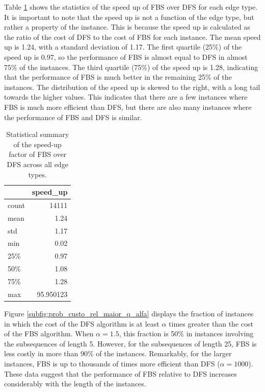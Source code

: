 \documentclass[journal=jacsat,manuscript=article]{achemso}
\begin{document}
Table \ref{tab:speedup_statistics} shows the statistics of the speed up of FBS over DFS for each edge type. It is important to note that the speed up is not a function of the edge type, but rather a property of the instance. This is because the speed up is calculated as the ratio of the cost of DFS to the cost of FBS for each instance. The mean speed up is 1.24, with a standard deviation of 1.17. The first quartile (25\%) of the speed up is 0.97, so the performance of FBS is almost equal to DFS in almost 75\% of the instances. The third quartile (75\%) of the speed up is 1.28, indicating that the performance of FBS is much better in the remaining 25\% of the instances. The distribution of the speed up is skewed to the right, with a long tail towards the higher values. This indicates that there are a few instances where FBS is much more efficient than DFS, but there are also many instances where the performance of FBS and DFS is similar.

\begin{table}[H]
    \centering
    \caption{\normalsize Statistical summary of the speed-up factor of FBS over DFS across all edge types.}
    \label{tab:speedup_statistics}
    \begin{tabular}{lr}
    \toprule
     & speed\_up \\
    \midrule
    count & 14111 \\
    mean & 1.24 \\
    std & 1.17 \\
    min & 0.02 \\
    25\% & 0.97 \\
    50\% & 1.08 \\
    75\% & 1.28 \\
    max & 95.950123 \\
    \bottomrule
    \end{tabular}
\end{table}


Figure \ref{subfig:prob_custo_rel_maior_q_alfa} displays the fraction of instances in which the cost of the DFS algorithm is at least $\alpha$ times greater than the cost of the FBS algorithm. When $\alpha=1.5$, this fraction is 50\% in instances involving the subsequences of {length} 5. However, for the subsequences of {length} 25, FBS is less costly in more than 90\% of the instances. Remarkably, for the larger instances, FBS is up to thousands of times more efficient than DFS ($\alpha=1000$). These data suggest that the performance of FBS relative to DFS increases considerably with the length of the instances.
\end{document}
